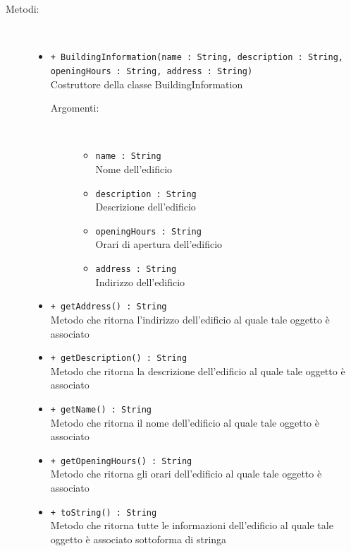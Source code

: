 \documentclass[../DefinizioneDiProdotto.tex]{subfiles}
\begin{document}
\begin{description}
\begin{itemize}
	\end{itemize}
	\item[Metodi:] \
	\begin{itemize}
		\item \texttt{+ BuildingInformation(name : String, description : String, openingHours : String, address : String)}\\
		Costruttore della classe BuildingInformation
		\begin{description}
			\item[Argomenti:] \
			\begin{itemize}
				\item \texttt{name : String}\\
				Nome dell'edificio\item \texttt{description : String}\\
				Descrizione dell'edificio\item \texttt{openingHours : String}\\
				Orari di apertura dell'edificio\item \texttt{address : String}\\
				Indirizzo dell'edificio\end{itemize}
		\end{description}
		\item \texttt{+ getAddress() : String}\\
		Metodo che ritorna l'indirizzo dell'edificio al quale tale oggetto è associato
		\item \texttt{+ getDescription() : String}\\
		Metodo che ritorna la descrizione dell'edificio al quale tale oggetto è associato
		\item \texttt{+ getName() : String}\\
		Metodo che ritorna il nome dell'edificio al quale tale oggetto è associato
		\item \texttt{+ getOpeningHours() : String}\\
		Metodo che ritorna gli orari dell'edificio al quale tale oggetto è associato
		\item \texttt{+ toString() : String}\\
		Metodo che ritorna tutte le informazioni dell'edificio al quale tale oggetto è associato sottoforma di stringa
	\end{itemize}
\end{description}
\end{document}
